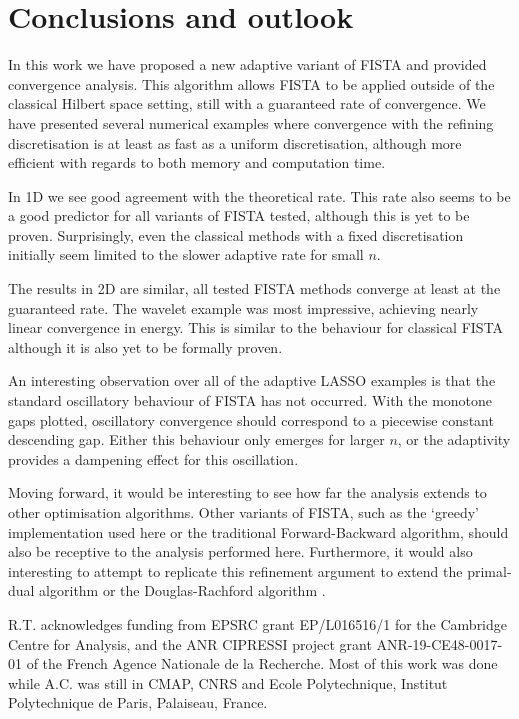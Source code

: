 \documentclass[smallextended]{svjour3}
\newcommand{\1}{\F{1}}
\begin{document}
	\section{Conclusions and outlook}
	In this work we have proposed a new adaptive variant of FISTA and provided convergence analysis. This algorithm allows FISTA to be applied outside of the classical Hilbert space setting, still with a guaranteed rate of convergence. We have presented several numerical examples where convergence with the refining discretisation is at least as fast as a uniform discretisation, although more efficient with regards to both memory and computation time. 
	
	In 1D we see good agreement with the theoretical rate. This rate also seems to be a good predictor for all variants of FISTA tested, although this is yet to be proven. Surprisingly, even the classical methods with a fixed discretisation initially seem limited to the slower adaptive rate for small $n$.
	
	The results in 2D are similar, all tested FISTA methods converge at least at the guaranteed rate. The wavelet example was most impressive, achieving nearly linear convergence in energy. This is similar to the behaviour for classical FISTA although it is also yet to be formally proven.
	
	An interesting observation over all of the adaptive LASSO examples is that the standard oscillatory behaviour of FISTA has not occurred. With the monotone gaps plotted, oscillatory convergence should correspond to a piecewise constant descending gap. Either this behaviour only emerges for larger $n$, or the adaptivity provides a dampening effect for this oscillation.
	
	Moving forward, it would be interesting to see how far the analysis extends to other optimisation algorithms. Other variants of FISTA, such as the `greedy' implementation used here or the traditional Forward-Backward algorithm, should also be receptive to the analysis performed here. Furthermore, it would also interesting to attempt to replicate this refinement argument to extend the primal-dual algorithm \cite{Chambolle2011} or the Douglas-Rachford algorithm \cite{Douglas1956}.
	
	\begin{acknowledgements}
		R.T. acknowledges funding from EPSRC grant EP/L016516/1 for the Cambridge Centre for Analysis, and the ANR CIPRESSI project grant ANR-19-CE48-0017-01 of the French Agence Nationale de la Recherche. Most of this work was done while A.C. was still in CMAP, CNRS and Ecole Polytechnique, Institut Polytechnique de Paris, Palaiseau, France.
	\end{acknowledgements}
\end{document}

